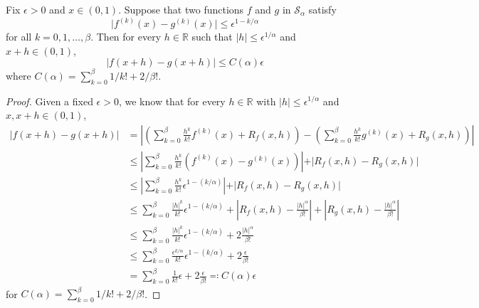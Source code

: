 \begin{lemma}\label{lma:Holder-smooth-3}
	Fix \(\epsilon  > 0\) and \(x \in (0, 1)\). Suppose that two functions \(f\) and \(g\) in \(\mathcal{S} _{\alpha }\) satisfy
	\[
		\vert f^{(k)} (x) - g^{(k)} (x) \vert \leq \epsilon ^{1 - k / \alpha }
	\]
	for all \(k = 0, 1, \dots , \beta \). Then for every \(h\in \mathbb{R} \) such that \(\vert h \vert \leq \epsilon ^{1 / \alpha }\) and \(x + h \in (0, 1)\),
	\[
		\vert f(x+h) - g(x+h) \vert \leq C(\alpha ) \epsilon
	\]
	where \(C(\alpha ) = \sum_{k=0}^{\beta } 1 / k! + 2 / \beta !\).
\end{lemma}
\begin{proof}
	Given a fixed \(\epsilon > 0\), we know that for every \(h\in \mathbb{R} \) with \(\vert h \vert \leq \epsilon ^{1 / \alpha }\) and \(x, x + h \in (0, 1)\),
	\[
		\begin{split}
			\vert f(x+h) - g(x+h) \vert
			&= \left\vert \left( \sum_{k=0}^{\beta } \frac{h^k}{k!}f^{(k)}(x) + R_f(x, h) \right) - \left( \sum_{k=0}^{\beta } \frac{h^k}{k!}g^{(k)}(x) + R_g(x, h) \right) \right\vert\\
			&\leq \left\vert \sum_{k=0}^{\beta } \frac{h^k}{k!}(f^{(k)}(x) - g^{(k)}(x)) \right\vert + \vert R_f(x, h) - R_g(x, h) \vert \\
			&\leq \left\vert \sum_{k=0}^{\beta } \frac{h^k}{k!} \epsilon ^{1 - (k / \alpha )} \right\vert + \vert R_f(x, h) - R_g(x, h) \vert \\
			&\leq \sum_{k=0}^{\beta } \frac{\vert h \vert ^k}{k!} \epsilon ^{1 - (k / \alpha )} + \left\vert R_f(x, h) - \frac{\vert h \vert ^\alpha }{\beta !} \right\vert + \left\vert R_g(x, h) - \frac{\vert h \vert ^\alpha }{\beta !}\right\vert \\
			&\leq \sum_{k=0}^{\beta } \frac{\vert h \vert ^k}{k!} \epsilon ^{1 - (k / \alpha )} + 2 \frac{\vert h \vert ^\alpha }{\beta !} \\
			&\leq \sum_{k=0}^{\beta } \frac{\epsilon ^{k / \alpha }}{k!} \epsilon ^{1 - (k / \alpha )} + 2 \frac{\epsilon }{\beta !} \\
			&= \sum_{k=0}^{\beta } \frac{1}{k!} \epsilon + 2 \frac{\epsilon}{\beta !}
			\eqqcolon C(\alpha ) \epsilon
		\end{split}
	\]
	for \(C(\alpha ) = \sum_{k=0}^{\beta } 1 / k! + 2 / \beta! \).
\end{proof}

